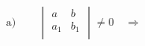 \documentclass[preview]{standalone}
\begin{document}
\begin{align*}
\text{a)}\qquad\begin{vmatrix}a&b\\a_1&b_1\\\end{vmatrix}\neq0\quad\Rightarrow\quad
\end{align*}
\end{document}
